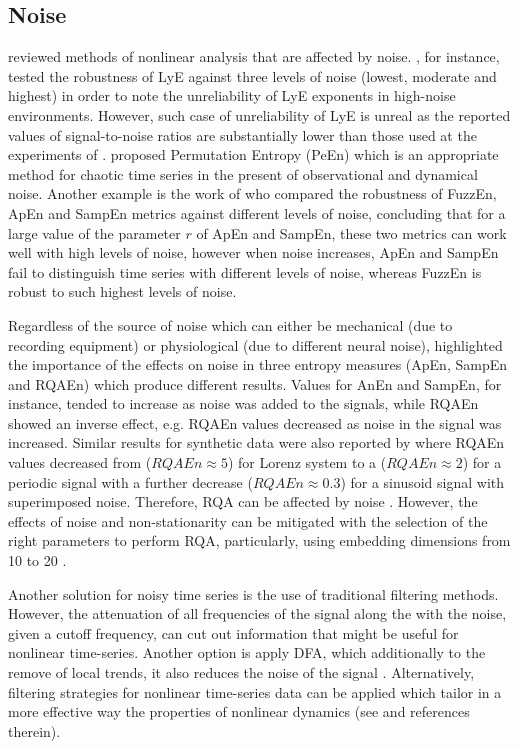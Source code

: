 \subsection{Noise}
\cite{caballero2014} reviewed methods of nonlinear analysis 
that are affected by noise.
\cite{rosenstein1993}, for instance, tested the robustness of LyE against 
three levels of noise (lowest, moderate and highest) in order to note 
the unreliability of LyE exponents in high-noise environments.
However, such case of unreliability of LyE is unreal as the reported 
values of signal-to-noise ratios are substantially lower than those 
used at the experiments of \cite{rosenstein1993}.
\cite{bandt2002} proposed Permutation Entropy (PeEn) which is
an appropriate method for chaotic time series in the present of 
observational and dynamical noise.
Another example is the work of \cite{chen2009} who compared the 
robustness of FuzzEn, ApEn and SampEn metrics against different levels of noise, 
concluding that for a large value of the parameter $r$ of ApEn and SampEn, 
these two metrics can work well with high levels of noise, however
when noise increases, ApEn and SampEn fail to distinguish time series with 
different levels of noise, whereas FuzzEn is robust to such highest 
levels of noise.

Regardless of the source of noise which can either be mechanical 
(due to recording equipment) or physiological (due to different neural noise), 
\cite{rhea2011} highlighted the importance of the effects on noise in three 
entropy measures (ApEn, SampEn and RQAEn) which produce different results.
Values for AnEn and SampEn, for instance, tended to increase as noise was 
added to the signals, while RQAEn  showed an inverse effect, e.g. RQAEn 
values decreased as noise in the signal was increased.
Similar results for synthetic data were also reported by \cite{pellecchia2005} 
where RQAEn values decreased from ($RQAEn \approx 5$) for Lorenz system to a 
($RQAEn \approx 2$) for a periodic signal with a further decrease 
($RQAEn \approx 0.3$) for a sinusoid signal with superimposed noise. 
Therefore, RQA can be affected by noise \citep{rhea2011}.
However, the effects of noise and non-stationarity
can be mitigated with the selection of the right parameters to perform RQA,
particularly, using embedding dimensions from 10 to 20 
\citep{webber2005}.

Another solution for noisy time series is the use of 
traditional filtering methods. However, the attenuation of all frequencies 
of the signal along the with the noise, given a cutoff frequency, can cut 
out information that might be useful for nonlinear time-series. 
Another option is apply DFA, which additionally to the remove of local 
trends, it also reduces the noise of the signal \citep{hausdorff1995}.
Alternatively, filtering strategies for nonlinear time-series data can 
be applied which tailor in a more effective way the properties of 
nonlinear dynamics (see \citealt*{bradley2015} and references therein).


